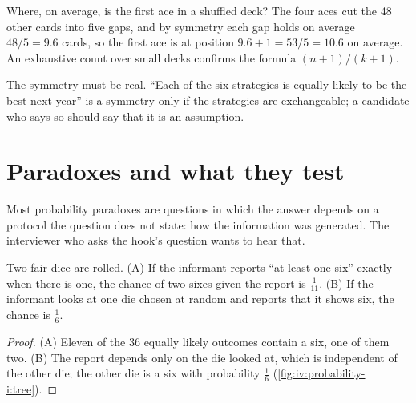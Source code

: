 \begin{example}\label{ex:iv:probability-i:ace}
Where, on average, is the first ace in a shuffled deck? The four aces cut the 48 other cards into five gaps, and
by symmetry each gap holds on average $48/5 = 9.6$ cards, so the first ace is at position $9.6 + 1 = 53/5 = 10.6$
on average. An exhaustive count over small decks confirms the formula $(n+1)/(k+1)$.
\end{example}

The symmetry must be real. ``Each of the six strategies is equally likely to be the best next year'' is a
symmetry only if the strategies are exchangeable; a candidate who says so should say that it is an assumption.

\section{Paradoxes and what they test}

Most probability paradoxes are questions in which the answer depends on a protocol the question does not state:
how the information was generated. The interviewer who asks the hook's question wants to hear that.

\begin{proposition}\label{prop:iv:probability-i:protocols}
Two fair dice are rolled. (A) If the informant reports ``at least one six'' exactly when there is one, the
chance of two sixes given the report is $\tfrac1{11}$. (B) If the informant looks at one die chosen at random
and reports that it shows six, the chance is $\tfrac16$.
\end{proposition}

\begin{proof}
(A) Eleven of the 36 equally likely outcomes contain a six, one of them two. (B) The report depends only on the
die looked at, which is independent of the other die; the other die is a six with probability $\tfrac16$
(\cref{fig:iv:probability-i:tree}).
\end{proof}


